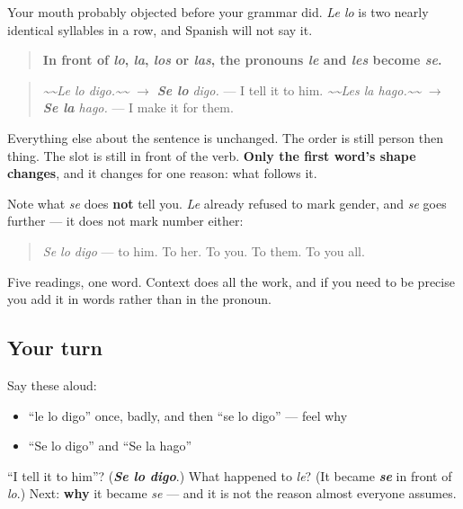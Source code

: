 \begin{grammarlens}[title={Grammar Lens: nobody says that}]
Your mouth probably objected before your grammar did. \emph{Le lo} is two nearly identical syllables in a row, and Spanish will not say it.

\begin{quote}
\textbf{In front of \emph{lo}, \emph{la}, \emph{los} or \emph{las}, the pronouns \emph{le} and \emph{les} become \emph{se}.}
\end{quote}

\begin{quote}
\emph{\textasciitilde{}\textasciitilde{}Le lo digo.\textasciitilde{}\textasciitilde{}} $\to$ \emph{\textbf{Se lo} digo.} — I tell it to him. \emph{\textasciitilde{}\textasciitilde{}Les la hago.\textasciitilde{}\textasciitilde{}} $\to$ \emph{\textbf{Se la} hago.} — I make it for them.
\end{quote}

Everything else about the sentence is unchanged. The order is still person then thing. The slot is still in front of the verb. \textbf{Only the first word's shape changes}, and it changes for one reason: what follows it.

Note what \emph{se} does \textbf{not} tell you. \emph{Le} already refused to mark gender, and \emph{se} goes further — it does not mark number either:

\begin{quote}
\emph{Se lo digo} — to him. To her. To you. To them. To you all.
\end{quote}

Five readings, one word. Context does all the work, and if you need to be precise you add it in words rather than in the pronoun.
\end{grammarlens}

\subsection*{Your turn}
Say these aloud:

\begin{itemize}
\raggedright
  \item \textquotedblleft{}le lo digo\textquotedblright{} once, badly, and then \textquotedblleft{}se lo digo\textquotedblright{} — feel why
  \item \textquotedblleft{}Se lo digo\textquotedblright{} and \textquotedblleft{}Se la hago\textquotedblright{}
\end{itemize}

\begin{tcolorbox}[breakable,colback=teal!4,colframe=teal!35!black,title={Before you move on}]
\textquotedblleft{}I tell it to him\textquotedblright{}? (\emph{\textbf{Se lo digo}}.) What happened to \emph{le}? (It became \emph{\textbf{se}} in front of \emph{lo}.) Next: \textbf{why} it became \emph{se} — and it is not the reason almost everyone assumes.
\end{tcolorbox}

